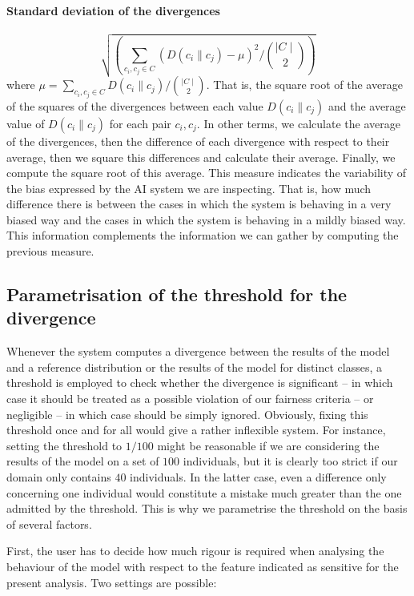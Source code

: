 \documentclass[
]{ceurart}
\begin{document}
\paragraph{Standard deviation of the divergences}
\[\sqrt{ (\sum_{c_i,c_j\in C} (D(c_i\parallel c_j)-\mu)^2 / \binom{\mid C\mid}{2}  )}\] where  $\mu = \sum_{c_i,c_j\in C} D(c_i\parallel c_j)/\binom{\mid C\mid}{2}$. That is, the square root of the average of the squares of the divergences between each value $D(c_i\parallel c_j)$ and the average value of $D(c_i\parallel c_j)$ for each pair $c_i,c_j$. In other terms,  we calculate the average of the divergences, then the difference of each divergence with respect to their average, then we square this differences and calculate their average. Finally, we compute the square root of this average.
This measure indicates the variability of the bias expressed by the AI system we are inspecting. That is, how much difference there is between the cases in which the system is behaving in a very biased way and the cases in which the system is behaving in a mildly biased way. This information complements the information we can gather by computing the previous measure.

\subsection{Parametrisation of the threshold for the divergence}\label{threshold}

Whenever the system computes a divergence between the results of the model and a reference distribution or the results of the model for distinct classes, a threshold is employed to check whether the divergence is significant -- in which case it should be treated as a possible violation of our fairness criteria -- or negligible -- in which case should be simply ignored. Obviously, fixing this threshold once and for all would give a rather inflexible system. For instance, setting the threshold to $1/100$ might be reasonable if we are considering the results of the model on a set of $100$ individuals, but it is clearly too strict if our domain only contains $40$ individuals. In the latter case, even a difference only concerning one individual would constitute a mistake much greater than the one admitted by the threshold. This is why we parametrise the threshold on the basis of several factors. 

First, the user has to decide how much rigour is required when analysing the behaviour of the model with respect to the feature indicated as sensitive for the present analysis. Two settings are possible: 
\end{document}
